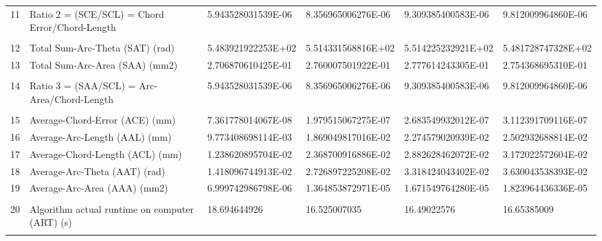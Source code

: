\begin{landscape}
\begin{table}[ht]
{\begin{tabular}{ p{0.2cm} p{8.80cm} p{4.00cm} p{4.0cm} p{4.00cm} p{4.0cm}}
	11	&	Ratio 2 = (SCE/SCL) = Chord Error/Chord-Length	&	5.943528031539E-06	&	8.356965006276E-06	&	9.309385400583E-06	&	9.812009964860E-06	\\
	&		&		&		&		&		\\
	12	&	Total Sum-Arc-Theta (SAT) (rad)	&	5.483921922253E+02	&	5.514331568816E+02	&	5.514225232921E+02	&	5.481728747328E+02	\\
	13	&	Total Sum-Arc-Area (SAA) (mm2)	&	2.706870610425E-01	&	2.760007501922E-01	&	2.777614243305E-01	&	2.754368695310E-01	\\
	&		&		&		&		&		\\
	14	&	Ratio 3 = (SAA/SCL) = Arc-Area/Chord-Length	&	5.943528031539E-06	&	8.356965006276E-06	&	9.309385400583E-06	&	9.812009964860E-06	\\
	&		&		&		&		&		\\
	15	&	Average-Chord-Error (ACE) (mm)	&	7.361778014067E-08	&	1.979515067275E-07	&	2.683549932012E-07	&	3.112391709116E-07	\\
	16	&	Average-Arc-Length (AAL) (mm)	&	9.773408698114E-03	&	1.869049817016E-02	&	2.274579020939E-02	&	2.502932688814E-02	\\
	17	&	Average-Chord-Length (ACL) (mm)	&	1.238620895704E-02	&	2.368700916886E-02	&	2.882628462072E-02	&	3.172022572604E-02	\\
	18	&	Average-Arc-Theta (AAT) (rad)	&	1.418096744913E-02	&	2.726897225208E-02	&	3.318424043402E-02	&	3.630043538393E-02	\\
	19	&	Average-Arc-Area (AAA) (mm2)	&	6.999742986798E-06	&	1.364853872971E-05	&	1.671549764280E-05	&	1.823964436336E-05	\\
	&		&		&		&		&		\\
	20	&	Algorithm actual runtime on computer (ART) (s) 	&	18.694644926	&	16.525007035	&	16.49022576	&	16.65385009	\\
	&		&		&		&		&		\\
\hline	
\end{tabular}

			
}   %
		
\end{table}
\end{landscape}

\clearpage
\pagebreak
